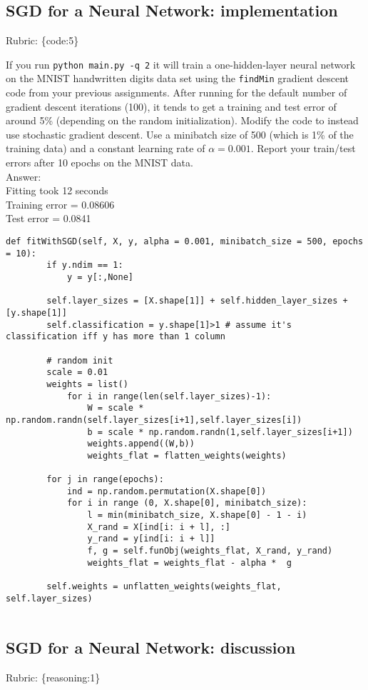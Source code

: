 \documentclass{article}
\def\rubric#1{\gre{Rubric: \{#1\}}}{}
\def\blu#1{{\color{blu}#1}}
\def\gre#1{{\color{gre}#1}}
\def\ans#1{\gre{Answer: #1}}{}
\begin{document}
\subsection{SGD for a Neural Network: implementation}
\rubric{code:5}


If you run \texttt{python main.py -q 2} it will train a one-hidden-layer neural network on the MNIST handwritten digits data set using the \texttt{findMin} gradient descent code from your previous assignments. After running for the default number of gradient descent iterations (100), it tends to get a training and test error of around 5\% (depending on the random initialization). 
\blu{Modify the code to instead use stochastic gradient descent. Use a minibatch size of 500 (which is 1\% of the training data) and a constant learning rate of $\alpha=0.001$. Report your train/test errors after 10 epochs on the MNIST data.} 
\\ \ans{\\ Fitting took 12 seconds \\
	Training error =  0.08606 \\
	Test error     =  0.0841}
\begin{lstlisting}[style = base]
	def fitWithSGD(self, X, y, alpha = 0.001, minibatch_size = 500, epochs = 10):
		if y.ndim == 1:
			y = y[:,None]
		
		self.layer_sizes = [X.shape[1]] + self.hidden_layer_sizes + [y.shape[1]]
		self.classification = y.shape[1]>1 # assume it's classification iff y has more than 1 column
		
		# random init
		scale = 0.01
		weights = list()
			for i in range(len(self.layer_sizes)-1):
				W = scale * np.random.randn(self.layer_sizes[i+1],self.layer_sizes[i])
				b = scale * np.random.randn(1,self.layer_sizes[i+1])
				weights.append((W,b))
				weights_flat = flatten_weights(weights)
				
		for j in range(epochs):
			ind = np.random.permutation(X.shape[0])
			for i in range (0, X.shape[0], minibatch_size):
				l = min(minibatch_size, X.shape[0] - 1 - i)
				X_rand = X[ind[i: i + l], :]
				y_rand = y[ind[i: i + l]]
				f, g = self.funObj(weights_flat, X_rand, y_rand) 
				weights_flat = weights_flat - alpha *  g
				
		self.weights = unflatten_weights(weights_flat, self.layer_sizes)
	
\end{lstlisting}

\subsection{SGD for a Neural Network: discussion}
\rubric{reasoning:1}
\end{document}
